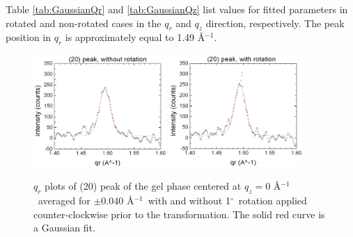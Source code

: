 \documentclass[letterpaper,12pt]{article}
\newcommand{\dg}{$^{\circ}$}%
\newcommand{\iang}{\AA$^{-1}$}%
\begin{document}
Table \ref{tab:GaussianQr} and \ref{tab:GaussianQz} list values for fitted parameters in rotated and non-rotated cases in the $q_r$ and $q_z$ direction, respectively. The peak position in $q_r$ is approximately equal to 1.49 \iang.
\begin{figure}[htbp]
	\centering
	\includegraphics[width=0.45\textwidth]{gel_20peak_qrplot1}
	\qquad
	\includegraphics[width=0.45\textwidth]{gel_20peak_qrplot2}
	\caption[$q_r$ plots of (20) peak of the gel phase]{$q_r$ plots of (20) peak of the gel phase centered at $q_z = 0$ \iang\ averaged for $\pm 0.040$ \iang\ with and without 1\dg\ rotation applied counter-clockwise prior to the transformation. The solid red curve is a Gaussian fit.} 
	\label{fig:GelQr}
\end{figure}
\end{document}
